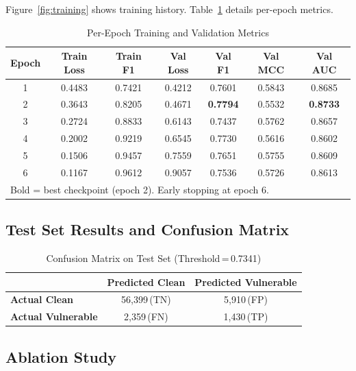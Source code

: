 \documentclass[12pt, letterpaper]{article}
\begin{document}
Figure~\ref{fig:training} shows training history.
Table~\ref{tab:epochs} details per-epoch metrics.

\begin{table}[H]
\centering
\caption{Per-Epoch Training and Validation Metrics}
\label{tab:epochs}
\begin{tabular}{ccccccc}
\toprule
\textbf{Epoch}&\textbf{Train Loss}&\textbf{Train F1}&\textbf{Val Loss}&
\textbf{Val F1}&\textbf{Val MCC}&\textbf{Val AUC}\\
\midrule
1&0.4483&0.7421&0.4212&0.7601         &0.5843&0.8685\\
2&0.3643&0.8205&0.4671&\textbf{0.7794}&0.5532&\textbf{0.8733}\\
3&0.2724&0.8833&0.6143&0.7437         &0.5762&0.8657\\
4&0.2002&0.9219&0.6545&0.7730         &0.5616&0.8602\\
5&0.1506&0.9457&0.7559&0.7651         &0.5755&0.8609\\
6&0.1167&0.9612&0.9057&0.7536         &0.5726&0.8613\\
\bottomrule
\multicolumn{7}{l}{\footnotesize Bold = best checkpoint (epoch 2).
  Early stopping at epoch 6.}
\end{tabular}
\end{table}



\subsection{Test Set Results and Confusion Matrix}

\begin{table}[H]
\centering
\caption{Confusion Matrix on Test Set (Threshold\,=\,0.7341)}
\label{tab:confusion}
\begin{tabular}{lcc}
\toprule
&\textbf{Predicted Clean}&\textbf{Predicted Vulnerable}\\
\midrule
\textbf{Actual Clean}     &56,399\,(TN)&5,910\,(FP)\\
\textbf{Actual Vulnerable}&2,359\,(FN) &1,430\,(TP)\\
\bottomrule
\end{tabular}
\end{table}



\subsection{Ablation Study}
\end{document}
